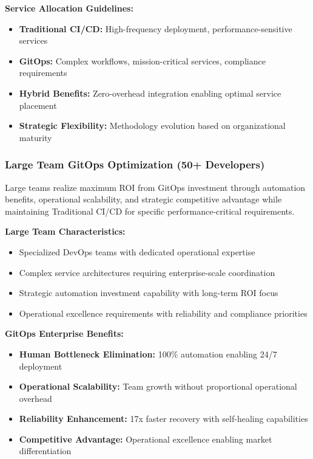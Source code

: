 \textbf{Service Allocation Guidelines:}
\begin{itemize}
\item \textbf{Traditional CI/CD:} High-frequency deployment, performance-sensitive services
\item \textbf{GitOps:} Complex workflows, mission-critical services, compliance requirements
\item \textbf{Hybrid Benefits:} Zero-overhead integration enabling optimal service placement
\item \textbf{Strategic Flexibility:} Methodology evolution based on organizational maturity
\end{itemize}

\subsubsection{Large Team GitOps Optimization (50+ Developers)}

Large teams realize maximum ROI from GitOps investment through automation benefits, operational scalability, and strategic competitive advantage while maintaining Traditional CI/CD for specific performance-critical requirements.

\textbf{Large Team Characteristics:}
\begin{itemize}
\item Specialized DevOps teams with dedicated operational expertise
\item Complex service architectures requiring enterprise-scale coordination
\item Strategic automation investment capability with long-term ROI focus
\item Operational excellence requirements with reliability and compliance priorities
\end{itemize}

\textbf{GitOps Enterprise Benefits:}
\begin{itemize}
\item \textbf{Human Bottleneck Elimination:} 100\% automation enabling 24/7 deployment
\item \textbf{Operational Scalability:} Team growth without proportional operational overhead
\item \textbf{Reliability Enhancement:} 17x faster recovery with self-healing capabilities
\item \textbf{Competitive Advantage:} Operational excellence enabling market differentiation
\end{itemize}

